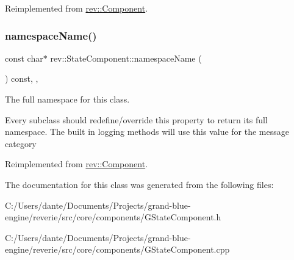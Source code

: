 Reimplemented from \mbox{\hyperlink{classrev_1_1_component_a07619152d5acafe7a536df3a6a476349}{rev\+::\+Component}}.

\mbox{\label{classrev_1_1_state_component_ae95ec4b4b31544c7b555ff80ac423162}} 
\subsubsection{\texorpdfstring{namespaceName()}{namespaceName()}}
{\footnotesize\ttfamily const char$\ast$ rev\+::\+State\+Component\+::namespace\+Name (\begin{DoxyParamCaption}{ }\end{DoxyParamCaption}) const\hspace{0.3cm}{\ttfamily [inline]}, {\ttfamily [override]}, {\ttfamily [virtual]}}



The full namespace for this class. 

Every subclass should redefine/override this property to return its full namespace. The built in logging methods will use this value for the message category 

Reimplemented from \mbox{\hyperlink{classrev_1_1_component_ae2827b14c278588b95e01c4743fae674}{rev\+::\+Component}}.



The documentation for this class was generated from the following files\+:\begin{DoxyCompactItemize}
\item 
C\+:/\+Users/dante/\+Documents/\+Projects/grand-\/blue-\/engine/reverie/src/core/components/G\+State\+Component.\+h\item 
C\+:/\+Users/dante/\+Documents/\+Projects/grand-\/blue-\/engine/reverie/src/core/components/G\+State\+Component.\+cpp\end{DoxyCompactItemize}
